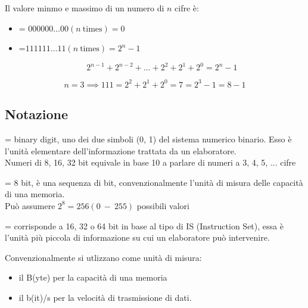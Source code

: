 \documentclass[12pt, a4paper]{article}
\begin{document}
\begin{defn}
Il valore minmo e massimo di un numero di $n$ cifre è:	
	\begin{itemize}
		\item {} = $ 000000\dots00(n\ \mbox{times}) = 0$
		\item {} =$ 111111\dots11(n\ \mbox{times}) = 2^n-1$
		
		\begin{equation}
			2^{n-1} + 2^{n-2} + \dots + 2^2 + 2^1 + 2^0 = 2^n -1
		\end{equation}
	\end{itemize}
\end{defn}

\begin{esem}


\begin{equation} 
	n = 3 \implies 111 = 2^2 + 2^1 + 2^0 = 7 = 2^3 - 1 = 8 - 1
\end{equation}
\end{esem}

\subsection{Notazione}
\begin{defn}[BIT]
 = binary digit, uno dei due simboli (0, 1) del sistema numerico binario.
Esso è l'unità elementare dell'informazione trattata da un elaboratore.\\
Numeri di 8, 16, 32 bit equivale in base 10 
a parlare di numeri a 3, 4, 5, ... cifre \\
\end{defn}

\begin{defn}[BYTE]
 = 8 bit, è una sequenza di bit, convenzionalmente l'unità di misura
delle capacità di una memoria.\\
Può assumere $2^8 = 256 (0\ -\ 255)$ possibili valori
\end{defn}

\begin{defn}[Parola]
 = corrisponde a 16, 32 o 64 bit in base al tipo di IS
(Instruction Set), essa è l'unità più piccola di informazione su cui un elaboratore
può intervenire.
\end{defn}


Convenzionalmente si utlizzano come unità di misura: 
\begin{itemize}
	\item il B(yte) per la capacità di una memoria
	\item il b(it)/s per la velocità di trasmissione di dati.
\end{itemize}
\end{document}
